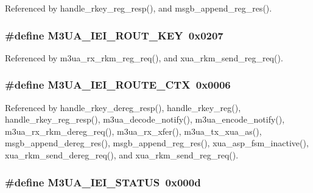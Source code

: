 Referenced by handle\+\_\+rkey\+\_\+reg\+\_\+resp(), and msgb\+\_\+append\+\_\+reg\+\_\+res().

\subsubsection[{M3\+U\+A\+\_\+\+I\+E\+I\+\_\+\+R\+O\+U\+T\+\_\+\+K\+EY}]{\setlength{\rightskip}{0pt plus 5cm}\#define M3\+U\+A\+\_\+\+I\+E\+I\+\_\+\+R\+O\+U\+T\+\_\+\+K\+EY~0x0207}\label{m3ua_8h_a765961ddba12a20eea909e79642a42d1}


Referenced by m3ua\+\_\+rx\+\_\+rkm\+\_\+reg\+\_\+req(), and xua\+\_\+rkm\+\_\+send\+\_\+reg\+\_\+req().

\subsubsection[{M3\+U\+A\+\_\+\+I\+E\+I\+\_\+\+R\+O\+U\+T\+E\+\_\+\+C\+TX}]{\setlength{\rightskip}{0pt plus 5cm}\#define M3\+U\+A\+\_\+\+I\+E\+I\+\_\+\+R\+O\+U\+T\+E\+\_\+\+C\+TX~0x0006}\label{m3ua_8h_aae931e3867a15435b52835f098b7dfb0}


Referenced by handle\+\_\+rkey\+\_\+dereg\+\_\+resp(), handle\+\_\+rkey\+\_\+reg(), handle\+\_\+rkey\+\_\+reg\+\_\+resp(), m3ua\+\_\+decode\+\_\+notify(), m3ua\+\_\+encode\+\_\+notify(), m3ua\+\_\+rx\+\_\+rkm\+\_\+dereg\+\_\+req(), m3ua\+\_\+rx\+\_\+xfer(), m3ua\+\_\+tx\+\_\+xua\+\_\+as(), msgb\+\_\+append\+\_\+dereg\+\_\+res(), msgb\+\_\+append\+\_\+reg\+\_\+res(), xua\+\_\+asp\+\_\+fsm\+\_\+inactive(), xua\+\_\+rkm\+\_\+send\+\_\+dereg\+\_\+req(), and xua\+\_\+rkm\+\_\+send\+\_\+reg\+\_\+req().

\subsubsection[{M3\+U\+A\+\_\+\+I\+E\+I\+\_\+\+S\+T\+A\+T\+US}]{\setlength{\rightskip}{0pt plus 5cm}\#define M3\+U\+A\+\_\+\+I\+E\+I\+\_\+\+S\+T\+A\+T\+US~0x000d}\label{m3ua_8h_a145d49356a5f9cc32ff41acb22f7b0a4}


